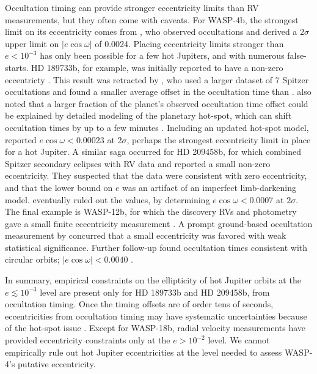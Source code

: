\documentclass[12pt,twocolumn,tighten]{aastex62}
\begin{document}
Occultation timing can provide stronger eccentricity limits than RV
measurements, but they often come with caveats.  For WASP-4b, the
strongest limit on its eccentricity comes from
\citet{beerer_secondary_2011}, who observed occultations and derived a
$2\sigma$ upper limit on $| e\cos\omega | $ of 0.0024.
Placing eccentricity limits stronger than $e< 10^{-3}$ has only been
possible for a few hot Jupiters, and with numerous false-starts.
HD 189733b, for example, was initially reported to have a non-zero
eccentricty
\citep{knutson_map_2007}.  This result was retracted by
\citet{agol_climate_2010}, who used a larger dataset of 7 Spitzer
occultations and found a smaller average offset in the occultation
time than \citet{knutson_map_2007}.  \citet{agol_climate_2010} also
noted that a larger fraction of the planet's observed occultation time
offset could be explained by detailed modeling of the planetary
hot-spot, which can shift occultation times by up to a few
minutes \citep{williams_resolving_2006}.  Including an updated
hot-spot model, \citet{agol_climate_2010} reported
$e\cos\omega < 0.00023$ at 2$\sigma$, perhaps the strongest
eccentricity limit in place
for a hot Jupiter.  A similar saga occurred for HD 209458b, for which
\citet{winn_measurement_2005} combined Spitzer secondary eclipses with
RV data and reported a small non-zero eccentricity.  They suspected that
the data were consistent with zero eccentricity, and that the lower
bound on $e$ was an artifact of an imperfect limb-darkening model.
\citet{crossfield_spitzer_mips_2012} eventually ruled out the \citet{winn_measurement_2005} values, by determining
$e\cos\omega < 0.0007$ at $2\sigma$.  The final example is WASP-12b, for
which the discovery RVs and photometry gave a small finite eccentricity
measurement \citep[][at $3\sigma$]{hebb_wasp-12b_2009}.  A prompt
ground-based occultation measurement by
\citet{lopez-morales_day-side_2010} concurred that a small eccentricity
was favored with weak statistical significance. Further follow-up found
occultation times consistent with circular orbits; $| e\cos\omega| <
0.0040 $ \citep{campo_orbit_2011,croll_near-infrared_2011}.

In summary, empirical constraints on the ellipticity of hot Jupiter
orbits at the $e \lesssim 10^{-3}$ level are present only for HD 189733b
and HD 209458b, from occultation timing.  Once the timing offsets are of
order tens of seconds, eccentricities from occultation timing may have
systematic uncertainties because of the hot-spot issue
\citep{williams_resolving_2006,agol_climate_2010}.  Except for
WASP-18b, radial velocity measurements have provided eccentricity
constraints only at the $e > 10^{-2}$ level.  We cannot empirically rule out
hot Jupiter eccentricities at the level needed to assess WASP-4's
putative eccentricity.
\end{document}
